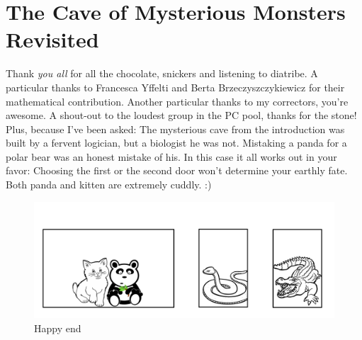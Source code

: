 \documentclass[hidelinks]{scrartcl}
\begin{document}
\newpage
\section{The Cave of Mysterious Monsters Revisited}
Thank \textit{you all} for all the chocolate, snickers and listening to diatribe. A particular thanks to Francesca Yffelti and Berta Brzeczyszczykiewicz for their mathematical contribution. Another particular thanks to my correctors, you're awesome. A shout-out to the loudest group in the PC pool, thanks for the stone! \\
Plus, because I've been asked: The mysterious cave from the introduction was built by a fervent logician, but a biologist he was not. Mistaking a panda for a polar bear was an honest mistake of his. In this case it all works out in your favor: Choosing the first or the second door won't determine your earthly fate. Both panda and kitten are extremely cuddly. :)

\begin{figure}[H]
	\caption{Happy end}
	\label{img:plus_panda}
	\centering
	\includegraphics[width=1\textwidth]{Illustrations/doors_animals_panda.png}
\end{figure} 

\newpage
\end{document}
